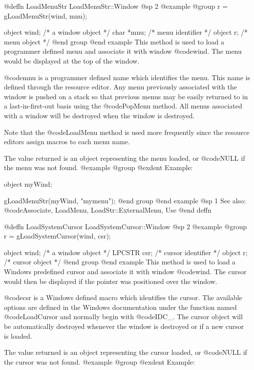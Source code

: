 @deffn {LoadMenuStr} LoadMenuStr::Window
@sp 2
@example
@group
r = gLoadMenuStr(wind, mnu);

object   wind;  /*  a window object  */
char    *mnu;   /*  menu identifier  */
object   r;     /*  menu object      */
@end group
@end example
This method is used to load a programmer defined menu and associate it
with window @code{wind}.  The menu would be displayed at the top
of the window.

@code{mnu} is a programmer defined name which identifies the menu.  This
name is defined through the resource editor.  Any menu previously associated
with the window is pushed on a stack so that previous menus may be easily
returned to in a last-in-first-out basis using the @code{PopMenu} method.
All menus associated with a window will be destroyed when the window
is destroyed.

Note that the @code{LoadMenu} method is used more frequently since the
resource editors assign macros to each menu name.

The value returned is an object representing the menu loaded, or
@code{NULL} if the menu was not found.
@example
@group
@exdent Example:

object  myWind;

gLoadMenuStr(myWind, "mymenu");
@end group
@end example
@sp 1
See also:  @code{Associate, LoadMenu, LoadStr::ExternalMenu, Use}
@end deffn












@deffn {LoadSystemCursor} LoadSystemCursor::Window
@sp 2
@example
@group
r = gLoadSystemCursor(wind, csr);

object   wind;  /*  a window object    */
LPCSTR   csr;   /*  cursor identifier  */
object   r;     /*  cursor object      */
@end group
@end example
This method is used to load a Windows predefined cursor and associate it
with window @code{wind}.  The cursor would then be displayed if the pointer
was positioned over the window.

@code{csr} is a Windows defined macro which identifies the cursor.  The
available options are defined in the Windows documentation under the
function named @code{LoadCursor} and normally begin with @code{IDC_}.  The
cursor object will be automatically destroyed whenever the window is
destroyed or if a new cursor is loaded.

The value returned is an object representing the cursor loaded, or
@code{NULL} if the cursor was not found.
@example
@group
@exdent Example:

